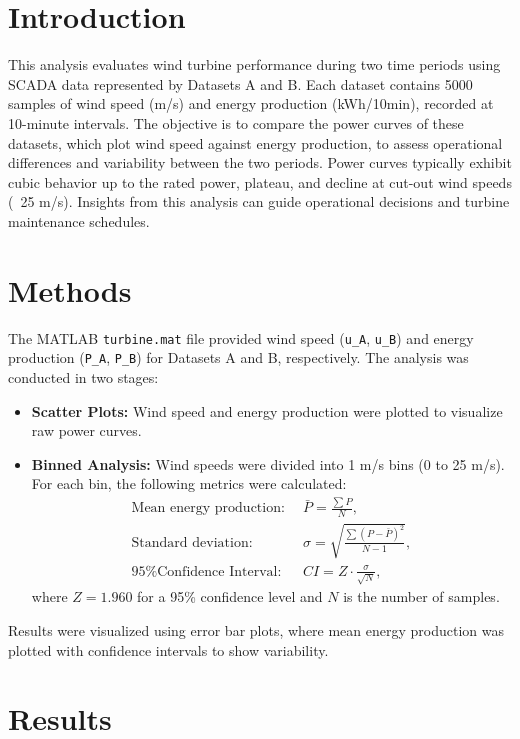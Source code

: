 \documentclass[a4paper,11pt]{article}
\begin{document}
\section*{Introduction}
This analysis evaluates wind turbine performance during two time periods using SCADA data represented by Datasets A and B. Each dataset contains 5000 samples of wind speed (m/s) and energy production (kWh/10min), recorded at 10-minute intervals. The objective is to compare the power curves of these datasets, which plot wind speed against energy production, to assess operational differences and variability between the two periods. Power curves typically exhibit cubic behavior up to the rated power, plateau, and decline at cut-out wind speeds (~25 m/s). Insights from this analysis can guide operational decisions and turbine maintenance schedules.

\section*{Methods}
The MATLAB \texttt{turbine.mat} file provided wind speed (\texttt{u\_A}, \texttt{u\_B}) and energy production (\texttt{P\_A}, \texttt{P\_B}) for Datasets A and B, respectively. The analysis was conducted in two stages:
\begin{itemize}
    \item \textbf{Scatter Plots:} Wind speed and energy production were plotted to visualize raw power curves.
    \item \textbf{Binned Analysis:} Wind speeds were divided into 1 m/s bins (0 to 25 m/s). For each bin, the following metrics were calculated:
    \begin{align}
        \text{Mean energy production: } & \, \bar{P} = \frac{\sum P}{N}, \\
        \text{Standard deviation: } & \, \sigma = \sqrt{\frac{\sum (P - \bar{P})^2}{N-1}}, \\
        \text{95\% Confidence Interval: } & \, CI = Z \cdot \frac{\sigma}{\sqrt{N}},
    \end{align}
    where $Z = 1.960$ for a 95\% confidence level and $N$ is the number of samples.
\end{itemize}

Results were visualized using error bar plots, where mean energy production was plotted with confidence intervals to show variability.

\section*{Results}
\end{document}
